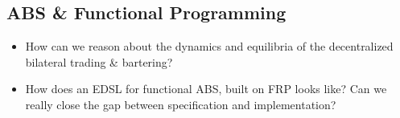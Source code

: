 \subsection{ABS \& Functional Programming}
\begin{itemize}
	\item How can we reason about the dynamics and equilibria of the decentralized bilateral trading \& bartering?
	\item How does an EDSL for functional ABS, built on FRP looks like? Can we really close the gap between specification and implementation?
\end{itemize}